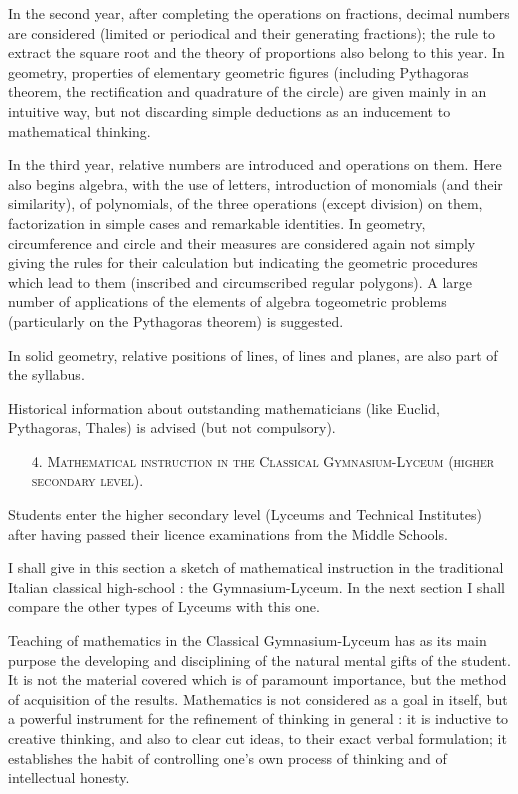 In the second year, after completing the operations on fractions, decimal numbers are considered (limited or periodical and their generating fractions); the rule to extract the square root and the theory of proportions also belong to this year. In geometry, properties of elementary geometric figures (including Pythagoras theorem, the rectification and quadrature of the circle) are given mainly in an intuitive way, but not discarding simple deductions as an inducement to mathematical thinking.

In the third year, relative numbers are introduced and operations on them. Here also begins algebra, with the use of letters, introduction of monomials (and their similarity), of polynomials, of the three operations (except division) on them, factorization in simple cases and remarkable identities. In geometry, circumference and circle and their measures are considered again not simply giving the rules for their calculation but indicating the geometric procedures which lead to them (inscribed and circumscribed regular polygons). A large number of applications of the elements of algebra to\pageoriginale geometric problems (particularly on the Pythagoras theorem) is suggested.

In solid geometry, relative positions of lines, of lines and planes, are also part of the syllabus.

Historical information about outstanding mathematicians (like Euclid, Pythagoras, Thales) is advised (but not compulsory).
\begin{itemize}
\item[4.] \textsc{Mathematical instruction in the Classical Gymnasium-Lyceum (higher secondary level).}
\end{itemize}

Students enter the higher secondary level (Lyceums and Technical Institutes) after having passed their licence examinations from the Middle Schools.

I shall give in this section a sketch of mathematical instruction in the traditional Italian classical high-school : the Gymnasium-Lyceum. In the next section I shall compare the other types of Lyceums with this one.

Teaching of mathematics in the Classical Gymnasium-Lyceum has as its main purpose the developing and disciplining of the natural mental gifts of the student. It is not the material covered which is of paramount importance, but the method of acquisition of the results. Mathematics is not considered as a goal in itself, but a powerful instrument for the refinement of thinking in general : it is inductive to creative thinking, and also to clear cut ideas, to their exact verbal formulation; it establishes the habit of controlling one's own process of thinking and of intellectual honesty.

